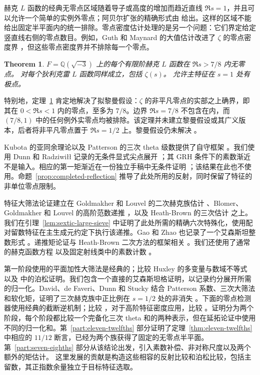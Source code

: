 \documentclass[11pt,a4paper]{article}
\numberwithin{equation}{section}
\numberwithin{figure}{section}
\newtheorem{theorem}{Theorem}[section]
\theoremstyle{definition}
\theoremstyle{remark}
\begin{document}
赫克 $L$ 函数的经典无零点区域随着导子或高度的增加而趋近直线 $\Re s=1$，并且可以允许一个简单的实例外零点；阿贝尔扩张的精确形式由 \cite[Theorem 3.1]{TZ} 给出。这样的区域不能给出固定半平面内的统一排除。零点密度估计处理的是另一个问题：它们界定给定竖直线右侧的零点数目。例如，Guth 和 Maynard 的大值估计改进了 $\zeta$ 的零点密度界 \cite[Theorem 1.2]{GM}，但这些零点密度界并不排除每一个零点。\begin{theorem}\label{thm:main}
$F=\mathbb Q(\sqrt{-3})$ 上的每个有限阶赫克 $L$ 函数在 $\Re s>7/8$ 内无零点。
对每个狄利克雷 $L$ 函数同样成立，包括 $\zeta(s)$。
允许主特征在 $s=1$ 处有极点。
\end{theorem}

特别地，定理~\ref{thm:main} 肯定地解决了拟黎曼假设：$\zeta$ 的非平凡零点的实部之上确界，即其在 $0<\Re s<1$ 内的零点，至多为 $7/8$。边界 $\Re s=7/8$ 不包含在内，而 $(7/8,1)$ 中的任何例外实零点均被排除。该定理并未建立黎曼假设或其广义版本，后者将非平凡零点置于 $\Re s=1/2$ 上。黎曼假设仍未解决 \cite{Clay}。

Kubota 的亚同余理论以及 Patterson 的三次 theta 级数提供了自守框架 \cite{Kubota,Patterson}。我们使用 Dunn 和 Radziwi\l\l{} 记录的无条件显式尖点展开 \cite[Section 5 and Appendix A]{DR}；其 GRH 条件下的素数渐近不是输入。相应的第一矩渐近在一份独立手稿中无条件证明 \cite[Theorem~1.1]{OpenAICubicFirstMoment}；该结果在此也不使用。命题~\ref{prop:completed-reflection} 推导了此处所用的反射，同时保留了特征的非单位零点限制。

特征大筛法论证建立在 Goldmakher 和 Louvel 的二次赫克族估计 \cite[Definition 1 and Theorem 1.1]{GL}、Blomer、Goldmakher 和 Louvel 的高阶范数递推 \cite[Theorem 1.3 and Section 3]{BGL}，以及 Heath-Brown 的三次估计 \cite[Theorem 2]{HB} 之上。我们在引理~\ref{lem:sextic-large-sieve} 中证明了此处所需的精确六次特殊化，使用配对留数特征在主生成元约定下执行该递推。Gao 和 Zhao 也记录了一个艾森斯坦整数形式 \cite[Lemma 2.9]{GZSextic}。递推矩论证与 Heath-Brown 二次方法的框架相关 \cite[Section 2]{HBQuadratic}。我们还使用了通常的赫克函数方程 \cite[Equation (1.1)]{GZ} 以及固定射线类中的素数计数 \cite[Theorem 1.1]{TZ}。

第一阶段使用的平面加性大筛法是经典的；比较 Huxley 的多变量与数域不等式 \cite{Huxley} 以及 \cite[Section 3, Theorem 3]{BaierBansal} 中的泊松证明。我们包含一个直接的艾森斯坦格证明，以记录约分展开所需的归一化。David、de Faveri、Dunn 和 Stucky 结合 Patterson 系数、三次大筛法和软化矩，证明了三次赫克族中正比例在 $s=1/2$ 处的非消失 \cite[Theorem 1.1 and Section 1.2]{DFDS}。下面的零点检测器使用经典的截断逆机制；比较 \cite[Appendix C]{MP}，对于高阶特征密度应用，比较 \cite[Corollary 1.6 and Section 5]{BGL}。证明分为两个阶段，每个阶段都比较一个完备化三次 theta 和的两种表示，但在延拓论证中使用不同的归一化和。第~\ref{part:eleven-twelfths} 部分证明了定理~\ref{thm:eleven-twelfths} 中相应的 $11/12$ 断言，已经为两个族获得了固定的无零点半平面。
第~\ref{part:seven-eighths} 部分从该结论出发，引入素数补偿、非对称尺度以及两个额外的矩估计。
这里发展的贡献是构造这些相容的反射比较和泊松比较，包括主留数，其正指数余量独立于目标特征选取。
\end{document}
